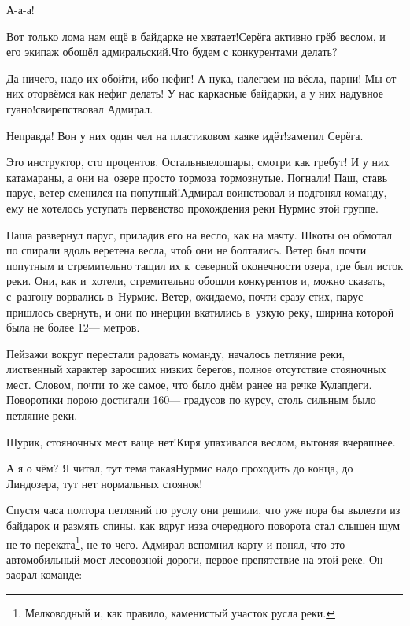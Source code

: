 \diagdash А-а-а!

\diagdash Вот только лома нам ещё в байдарке не хватает!\mdash Серёга активно грёб веслом, и его экипаж обошёл адмиральский.\mdash Что будем с конкурентами делать?

\diagdash Да ничего, надо их обойти, ибо нефиг! А ну\sdash ка, налегаем на вёсла, парни! Мы от них оторвёмся как нефиг делать! У нас каркасные байдарки, а у них надувное гуано!\mdash свирепствовал Адмирал.

\diagdash Неправда! Вон у них один чел на пластиковом каяке идёт!\mdash заметил Серёга.

\diagdash Это инструктор, сто процентов. Остальные\mdash лошары, смотри как гребут! И у них катамараны, а они на~озере просто тормоза тормознутые. Погнали! Паш, ставь парус, ветер сменился на попутный!\mdash Адмирал воинствовал и подгонял команду, ему не хотелось уступать первенство прохождения реки Нурмис этой группе.

Паша развернул парус, приладив его на весло, как на мачту. Шкоты он обмотал по спирали вдоль веретена весла, чтоб они не болтались. Ветер был почти попутным и стремительно тащил их к~северной оконечности озера, где был исток реки. Они, как и~хотели, стремительно обошли конкурентов и, можно сказать, с~разгону ворвались в~Нурмис. Ветер, ожидаемо, почти сразу стих, парус пришлось свернуть, и они по инерции вкатились в~узкую реку, ширина которой была не более 12\thinspace\nobreakdash--- метров.

Пейзажи вокруг перестали радовать команду, началось петляние реки, лиственный характер заросших низких берегов, полное отсутствие стояночных мест. Словом, почти то же самое, что было днём ранее на речке Кулапдеги. Поворотики порою достигали 160\thinspace\nobreakdash--- градусов по курсу, столь сильным было петляние реки.

\diagdash Шурик, стояночных мест ваще нет!\mdash Киря упахивался веслом, выгоняя вчерашнее.

\diagdash А я о чём? Я читал, тут тема такая\mdash Нурмис надо проходить до конца, до Линдозера, тут нет нормальных стоянок!

\renewcommand*{\thefootnote}{\fnsymbol{footnote}}
\setcounter{footnote}{0}
Спустя часа полтора петляний по руслу они решили, что уже пора бы вылезти из байдарок и размять спины, как вдруг из\sdash за очередного поворота стал слышен шум не то переката\footnote{Мелководный и, как правило, каменистый участок русла реки.}, не то чего. Адмирал вспомнил карту и понял, что это автомобильный мост лесовозной дороги, первое препятствие на этой реке. Он заорал команде:

